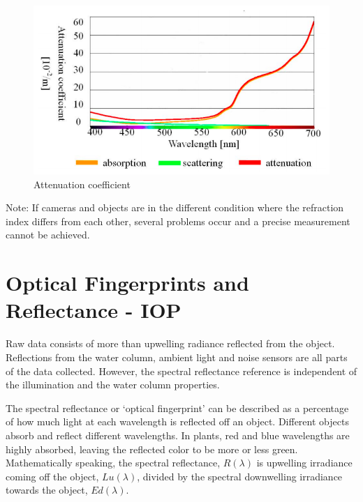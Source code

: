 \begin{figure}[H]
\centering
  \includegraphics[width=\linewidth]{Images/theory/attcoeff.png}
  \caption{Attenuation coefficient}
  \label{fig:attcoeff}
\end{figure}




Note: If cameras and objects are in the different condition where the refraction index differs from each other, several problems occur and a precise measurement cannot be achieved.

\section{Optical Fingerprints and Reflectance - IOP}
Raw data consists of more than upwelling radiance reflected from the object. Reflections from the water column, ambient light and noise sensors are all parts of the data collected. However, the spectral reflectance reference is independent of the illumination and the water column properties. 

The spectral reflectance or ‘optical fingerprint’ can be described as a percentage of how much light at each wavelength is reflected off an object. Different objects absorb and reflect different wavelengths. In plants, red and blue wavelengths are highly absorbed, leaving the reflected color to be more or less green. Mathematically speaking, the spectral reflectance, $R(\lambda)$ is upwelling irradiance coming off the object, $Lu(\lambda)$, divided by the spectral downwelling irradiance towards the object, $Ed(\lambda)$.

